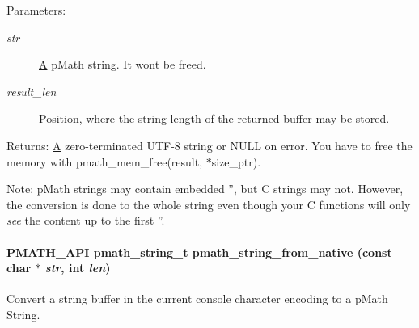 \begin{Desc}
\item[Parameters:]
\begin{description}
\item[{\em str}]\hyperlink{class_a}{A} pMath string. It wont be freed. \item[{\em result\_\-len}]Position, where the string length of the returned buffer may be stored. \end{description}
\end{Desc}
\begin{Desc}
\item[Returns:]\hyperlink{class_a}{A} zero-terminated UTF-8 string or NULL on error. You have to free the memory with pmath\_\-mem\_\-free(result, $\ast$size\_\-ptr).\end{Desc}
\begin{Desc}
\item[Note:]pMath strings may contain embedded '', but C strings may not. However, the conversion is done to the whole string even though your C functions will only {\em see\/} the content up to the first ''. \end{Desc}
\hypertarget{group__strings_g37cf187968e366edd0998dda0bd5ea7a}{
\paragraph[{pmath\_\-string\_\-from\_\-native}]{\setlength{\rightskip}{0pt plus 5cm}PMATH\_\-API {\bf pmath\_\-string\_\-t} pmath\_\-string\_\-from\_\-native (const char $\ast$ {\em str}, \/  int {\em len})}\hfill}
\label{group__strings_g37cf187968e366edd0998dda0bd5ea7a}


Convert a string buffer in the current console character encoding to a pMath String. 

